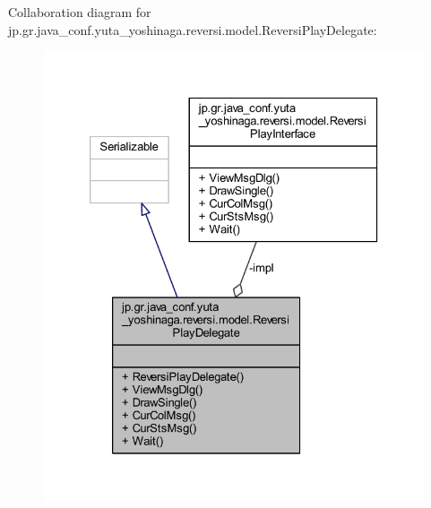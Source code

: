 Collaboration diagram for jp.\+gr.\+java\+\_\+conf.\+yuta\+\_\+yoshinaga.\+reversi.\+model.\+Reversi\+Play\+Delegate\+:
\nopagebreak
\begin{figure}[H]
\begin{center}
\leavevmode
\includegraphics[width=326pt]{classjp_1_1gr_1_1java__conf_1_1yuta__yoshinaga_1_1reversi_1_1model_1_1_reversi_play_delegate__coll__graph}
\end{center}
\end{figure}
